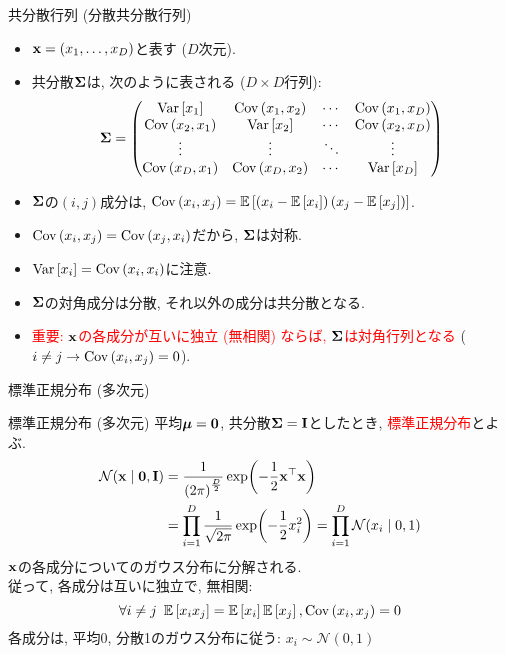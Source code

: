 \documentclass[dvipdfmx,notheorems,t]{beamer}
\begin{document}
\begin{frame}{共分散行列 (分散共分散行列)}
\begin{itemize}
  \item $\vb{x} = (x_1, \ldots, x_D)$と表す ($D$次元).
  \item 共分散$\vb{\Sigma}$は, 次のように表される ($D \times D$行列):
  \begin{align*}
    \vb{\Sigma} = \mqty(\Var{x_1} & \Cov{x_1}{x_2} & \cdots & \Cov{x_1}{x_D} \\
      \Cov{x_2}{x_1} & \Var{x_2} & \cdots & \Cov{x_2}{x_D} \\
      \vdots & \vdots & \ddots & \vdots \\
      \Cov{x_D}{x_1} & \Cov{x_D}{x_2} & \cdots & \Var{x_D})
  \end{align*}
  \item $\vb{\Sigma}$の$(i, j)$成分は, $\operatorname{Cov} \left( x_i, x_j \right) = \operatorname{\mathbb{E}} \left[ \left( x_i - \operatorname{\mathbb{E}} \left[ x_i \right] \right) \left( x_j - \operatorname{\mathbb{E}} \left[ x_j \right] \right) \right]$.
  \item $\operatorname{Cov} \left( x_i, x_j \right) = \operatorname{Cov} \left( x_j, x_i \right)$だから, $\vb{\Sigma}$は対称.
  \item $\operatorname{Var} \left[ x_i \right] = \operatorname{Cov} \left( x_i, x_i \right)$に注意.
  \item $\vb{\Sigma}$の対角成分は分散, それ以外の成分は共分散となる.
  \item \textcolor{red}{重要: $\vb{x}$の各成分が互いに独立 (無相関) ならば, $\vb{\Sigma}$は対角行列となる}
  ($i \neq j \to \operatorname{Cov} \left( x_i, x_j \right) = 0$).
\end{itemize}
\end{frame}

\begin{frame}{標準正規分布 (多次元)}
\begin{block}{標準正規分布 (多次元)}
  平均$\vb*{\mu} = \vb{0}$, 共分散$\vb{\Sigma} = \vb{I}$としたとき, \textcolor{red}{標準正規分布}とよぶ.
  \begin{align*}
    \mathcal{N}(\vb{x} \mid \vb{0}, \vb{I})
    &= \frac{1}{\left( 2\pi \right)^\frac{D}{2}}
      \exp(-\frac{1}{2} \vb{x}^\top \vb{x}) \\
    &= \prod_{i = 1}^D \frac{1}{\sqrt{2\pi}} \exp(-\frac{1}{2} x_i^2)
    = \prod_{i = 1}^D \mathcal{N}(x_i \mid 0, 1)
  \end{align*}
  $\vb{x}$の各成分についてのガウス分布に分解される. \\
  従って, 各成分は互いに独立で, 無相関:
  $$\forall i \neq j \ \operatorname{\mathbb{E}} \left[ x_i x_j \right] = \operatorname{\mathbb{E}} \left[ x_i \right] \operatorname{\mathbb{E}} \left[ x_j \right], \operatorname{Cov} \left( x_i, x_j \right) = 0$$
  各成分は, 平均0, 分散1のガウス分布に従う: $x_i \sim \mathcal{N}(0, 1)$
\end{block}
\end{frame}
\end{document}
